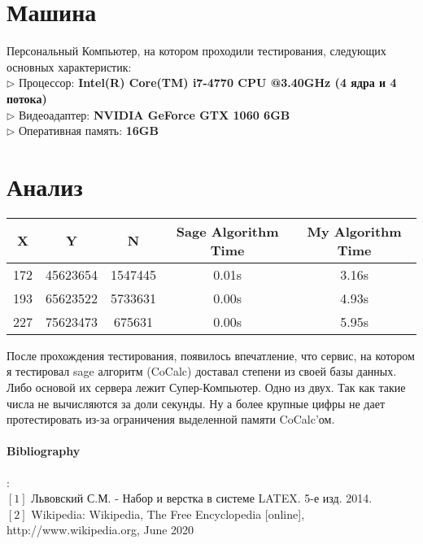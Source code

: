 \documentclass[11pt]{article}
\begin{document}
\section{Машина}
Персональный Компьютер, на котором проходили тестирования, следующих основных характеристик:
\\$\triangleright$ Процессор: \textbf{Intel(R) Core(TM) i7-4770 CPU @3.40GHz (4 ядра и 4 потока)}
\\$\triangleright$ Видеоадаптер: \textbf{NVIDIA GeForce GTX 1060 6GB}
\\$\triangleright$ Оперативная память: \textbf{16GB}

\section{Анализ}

\begin{tabular}{|c|c|c|c|c|}
\hline
X & Y & N & Sage Algorithm Time & My Algorithm Time\\
\hline
\hline
172 & 45623654 & 1547445 & 0.01s & 3.16s\\
193 & 65623522 & 5733631 & 0.00s & 4.93s\\
227 & 75623473 & 675631 & 0.00s & 5.95s\\
\hline
\end{tabular}

После прохождения тестирования, появилось впечатление, что сервис, на котором я тестировал sage алгоритм (CoCalc) доставал степени из своей базы данных. Либо основой их сервера лежит Супер-Компьютер. Одно из двух. Так как такие числа не вычисляются за доли секунды. Ну а более крупные цифры не дает протестировать из-за ограничения выделенной памяти CoCalc'ом.


\paragraph{Bibliography}:
\\ $[1]$ Львовский С.М. - Набор и верстка в системе LATEX. 5-е изд. 2014.
\\ $[2]$ Wikipedia: Wikipedia, The Free Encyclopedia [online], http://www.wikipedia.org, June 2020
\end{document}

